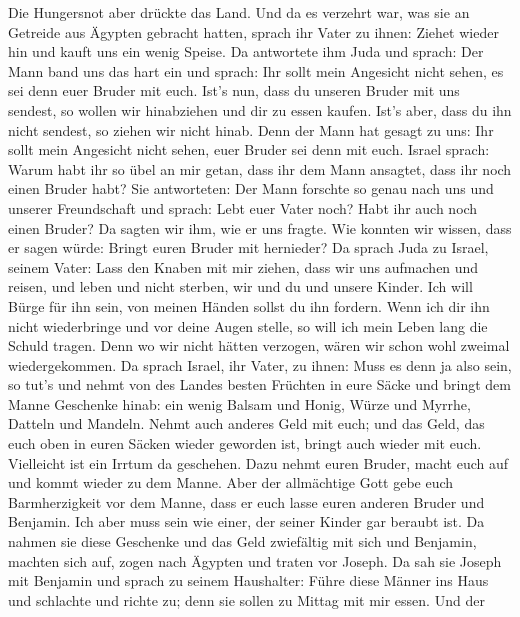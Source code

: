  Die Hungersnot aber drückte das Land.  Und
da es verzehrt war, was sie an Getreide aus Ägypten gebracht hatten,
sprach ihr Vater zu ihnen: Ziehet wieder hin und kauft uns ein wenig
Speise.  Da antwortete ihm Juda und sprach: Der Mann band
uns das hart ein und sprach: Ihr sollt mein Angesicht nicht sehen, es
sei denn euer Bruder mit euch.  Ist's nun, dass du unseren
Bruder mit uns sendest, so wollen wir hinabziehen und dir zu essen
kaufen.  Ist's aber, dass du ihn nicht sendest, so ziehen
wir nicht hinab. Denn der Mann hat gesagt zu uns: Ihr sollt mein
Angesicht nicht sehen, euer Bruder sei denn mit euch. 
Israel sprach: Warum habt ihr so übel an mir getan, dass ihr dem Mann
ansagtet, dass ihr noch einen Bruder habt?  Sie
antworteten: Der Mann forschte so genau nach uns und unserer
Freundschaft und sprach: Lebt euer Vater noch? Habt ihr auch noch einen
Bruder? Da sagten wir ihm, wie er uns fragte. Wie konnten wir wissen,
dass er sagen würde: Bringt euren Bruder mit hernieder? 
Da sprach Juda zu Israel, seinem Vater: Lass den Knaben mit mir ziehen,
dass wir uns aufmachen und reisen, und leben und nicht sterben, wir und
du und unsere Kinder.  Ich will Bürge für ihn sein, von
meinen Händen sollst du ihn fordern. Wenn ich dir ihn nicht wiederbringe
und vor deine Augen stelle, so will ich mein Leben lang die Schuld
tragen.  Denn wo wir nicht hätten verzogen, wären wir
schon wohl zweimal wiedergekommen.  Da sprach Israel, ihr
Vater, zu ihnen: Muss es denn ja also sein, so tut's und nehmt von des
Landes besten Früchten in eure Säcke und bringt dem Manne Geschenke
hinab: ein wenig Balsam und Honig, Würze und Myrrhe, Datteln und
Mandeln.  Nehmt auch anderes Geld mit euch; und das Geld,
das euch oben in euren Säcken wieder geworden ist, bringt auch wieder
mit euch. Vielleicht ist ein Irrtum da geschehen.  Dazu
nehmt euren Bruder, macht euch auf und kommt wieder zu dem Manne.
 Aber der allmächtige Gott gebe euch Barmherzigkeit vor
dem Manne, dass er euch lasse euren anderen Bruder und Benjamin. Ich
aber muss sein wie einer, der seiner Kinder gar beraubt ist.
 Da nahmen sie diese Geschenke und das Geld zwiefältig
mit sich und Benjamin, machten sich auf, zogen nach Ägypten und traten
vor Joseph.  Da sah sie Joseph mit Benjamin und sprach zu
seinem Haushalter: Führe diese Männer ins Haus und schlachte und richte
zu; denn sie sollen zu Mittag mit mir essen.  Und der
